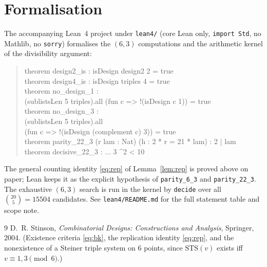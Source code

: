\documentclass[11pt]{article}
\theoremstyle{definition}
\theoremstyle{remark}
\begin{document}
\section{Formalisation}

The accompanying Lean~4 project under \texttt{lean4/} (core Lean only,
\texttt{import Std}, no Mathlib, no \texttt{sorry}) formalises the $(6,3)$
computations and the arithmetic kernel of the divisibility argument:

\begin{quote}\small\ttfamily
theorem design2\_is : isDesign design2 2 = true\\
theorem design4\_is : isDesign triples 4 = true\\
theorem no\_design\_1 :\\
\hspace*{2em}(sublistsLen 5 triples).all (fun c => !(isDesign c 1)) = true\\
theorem no\_design\_3 :\\
\hspace*{2em}(sublistsLen 5 triples).all\\
\hspace*{4em}(fun c => !(isDesign (complement c) 3)) = true\\
theorem parity\_22\_3 (r lam : Nat) (h : 2 * r = 21 * lam) : 2 | lam\\
theorem decisive\_22\_3 : ... 3 \textasciicircum 2 < 10
\end{quote}

The general counting identity \eqref{eq:rep} of Lemma~\ref{lem:rep} is proved
above on paper; Lean keeps it as the explicit hypothesis of
\texttt{parity\_6\_3} and \texttt{parity\_22\_3}. The exhaustive $(6,3)$ search
is run in the kernel by \texttt{decide} over all $\binom{20}{5}=15504$
candidates. See \texttt{lean4/README.md} for the full statement table and scope
note.

\begin{thebibliography}{9}
D.~R. Stinson, \emph{Combinatorial Designs: Constructions and Analysis},
Springer, 2004. (Existence criteria \eqref{eq:bk}, the replication identity
\eqref{eq:rep}, and the nonexistence of a Steiner triple system on $6$ points,
since $\mathrm{STS}(v)$ exists iff $v\equiv 1,3\pmod 6$.)
\end{thebibliography}
\end{document}
